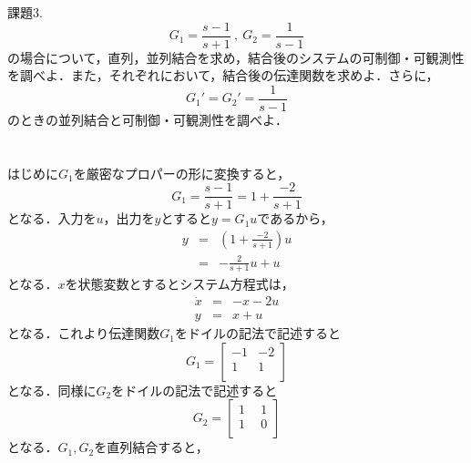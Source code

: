 \documentclass[a4paper,12pt]{jarticle}
\begin{document}
 \begin{itembox}[l]{\Large{課題3.}}
\begin{equation}
 G_1=\frac{s-1}{s+1}~,~G_2=\frac{1}{s-1}
 \end{equation}
 の場合について，直列，並列結合を求め，結合後のシステムの可制御・可観測性
 を調べよ．また，それぞれにおいて，結合後の伝達関数を求めよ．さらに，
 \begin{equation}
  G_1'=G_2'=\frac{1}{s-1}  
 \end{equation}
 のときの並列結合と可制御・可観測性を調べよ．
 \end{itembox}
\vspace{-10mm}
\section*{}
はじめに$G_1$を厳密なプロパーの形に変換すると，
%
\begin{equation}
 G_1=\frac{s-1}{s+1}=1+\frac{-2}{s+1}
\end{equation}
%
となる．入力を$u$，出力を$y$とすると$y=G_1u$であるから，
%
\begin{eqnarray}
 y&=&\left(1+\frac{-2}{s+1}\right)u \nonumber\\
  &=&-\frac{2}{s+1}u+u
\end{eqnarray}
%
となる．$x$を状態変数とするとシステム方程式は，
%
\begin{eqnarray}
 \dot{x}&=&-x-2u\\
 y&=&x+u
\end{eqnarray}
%
となる．これより伝達関数$G_1$をドイルの記法で記述すると
%
\begin{equation}
 G_1=\left[
  \begin{array}{c|c}
  -1 & -2  \\ \hline
   1 & 1   \\ 
  \end{array}
  \right]
\end{equation}
%
となる．同様に$G_2$をドイルの記法で記述すると
%
\begin{equation}
 G_2=\left[
  \begin{array}{c|c}
  1 ~&~ 1  \\ \hline
  1 ~&~ 0   \\ 
  \end{array}
  \right]
\end{equation}
%
となる．$G_1,G_2$を直列結合すると，
%
\end{document}
